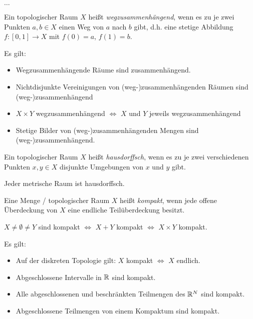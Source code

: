 ﻿$\dots$

\begin{defi}[Wegzusammenhang]
Ein topologischer Raum $X$ heißt \emph{wegzusammenhängend}, wenn es zu je zwei Punkten $a, b \in X$ einen Weg von $a$ nach $b$ gibt, d.h. eine stetige Abbildung $f: [0, 1] \to X$ mit $f(0) = a$, $f(1) = b$.
\end{defi}

\begin{bem} Es gilt:
\begin{itemize}
\item Wegzusammenhängende Räume sind zusammenhängend.
\item Nichtdisjunkte Vereinigungen von (weg-)zusammenhängenden Räumen sind (weg-)zusammenhängend
\item $X \times Y$ wegzusammenhängend $\Leftrightarrow$ $X$ und $Y$ jeweils wegzusammenhängend
\item Stetige Bilder von (weg-)zusammenhängenden Mengen sind (weg-)zusammenhängend. \\
\end{itemize}
\end{bem}


\begin{defi}[Hausdorffsch]
Ein topologischer Raum $X$ heißt \emph{hausdorffsch}, wenn es zu je zwei verschiedenen Punkten $x, y \in X$ disjunkte Umgebungen von $x$ und $y$ gibt.
\end{defi}

\begin{bem} Jeder metrische Raum ist hausdorffsch. \\
\end{bem}

\begin{defi}[Kompaktheit]
Eine Menge / topologischer Raum $X$ heißt \emph{kompakt}, wenn jede offene Überdeckung von $X$ eine endliche Teilüberdeckung besitzt.
\end{defi}

\begin{bem} $X \neq \emptyset \neq Y$ sind kompakt $\Leftrightarrow$ $X + Y$ kompakt $\Leftrightarrow$ $X \times Y$ kompakt.
\end{bem}

\begin{bsp} Es gilt:
\begin{itemize}
\item Auf der diskreten Topologie gilt: $X$ kompakt $\Leftrightarrow$ $X$ endlich.
\item Abgeschlossene Intervalle in $\mathbb R$ sind kompakt.
\item Alle abgeschlossenen und beschränkten Teilmengen des $\mathbb R^N$ sind kompakt.
\item Abgeschlossene Teilmengen von einem Kompaktum sind kompakt. \\
\end{itemize}
\end{bsp}

